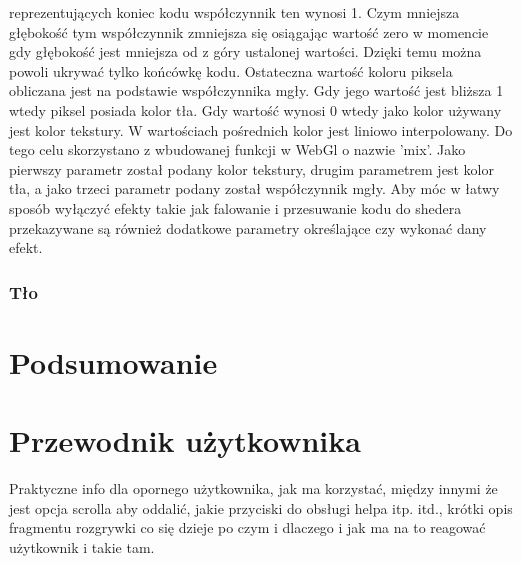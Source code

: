 \documentclass[11pt,a4paper,polish,thesis]{dcsbook}
\begin{document}
reprezentujących koniec kodu współczynnik ten wynosi 1. Czym mniejsza głębokość tym współczynnik zmniejsza się osiągając wartość zero w momencie gdy głębokość jest mniejsza od z góry ustalonej wartości. Dzięki temu można powoli ukrywać tylko końcówkę kodu. Ostateczna wartość koloru piksela obliczana jest na podstawie współczynnika mgły. Gdy jego wartość jest bliższa 1 wtedy piksel posiada kolor tła. Gdy wartość wynosi 0 wtedy jako kolor używany jest kolor tekstury. W wartościach pośrednich kolor jest liniowo interpolowany. Do tego celu skorzystano z wbudowanej funkcji w WebGl o nazwie 'mix'. Jako pierwszy parametr został podany kolor tekstury, drugim parametrem jest kolor tła, a jako trzeci parametr podany został współczynnik mgły. Aby móc w łatwy sposób wyłączyć efekty takie jak falowanie i przesuwanie kodu do shedera przekazywane są również dodatkowe parametry określające czy wykonać dany efekt.  
	
	\subsection{Tło}

	\chapter{Podsumowanie}
	
	\appendix
	
	\chapter{Przewodnik użytkownika}
	
	Praktyczne info dla opornego użytkownika, jak ma korzystać, między innymi że jest opcja scrolla aby oddalić, jakie przyciski do obsługi helpa itp. itd., krótki opis fragmentu rozgrywki co się dzieje po czym i dlaczego i jak ma na to reagować użytkownik i takie tam.
	
	\backmatter
	
\end{document}
